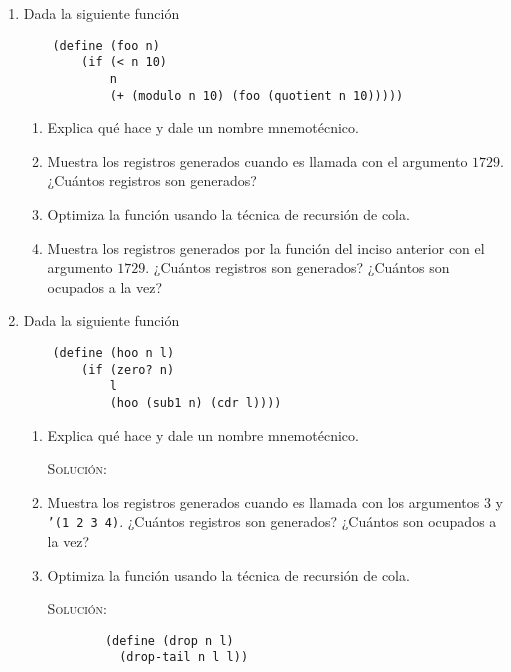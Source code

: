 \documentclass[letterpaper,11pt]{article}
\begin{document}
\begin{enumerate}
    \item Dada la siguiente función 
    \begin{verbatim}
    (define (foo n)
        (if (< n 10)
            n
            (+ (modulo n 10) (foo (quotient n 10)))))
    \end{verbatim}

    \begin{enumerate}
        \item Explica qué hace y dale un nombre mnemotécnico.

        \item Muestra los registros generados cuando es llamada con el 
        argumento $1729$. ¿Cuántos registros son generados?

        \item Optimiza la función usando la técnica de recursión de cola.

        \item Muestra los registros generados por la función del inciso anterior 
        con el argumento $1729$. ¿Cuántos registros son generados? ¿Cuántos son 
        ocupados a la vez?
    \end{enumerate}

    \item Dada la siguiente función 
    \begin{verbatim}
    (define (hoo n l)
        (if (zero? n)
            l
            (hoo (sub1 n) (cdr l))))
    \end{verbatim}

    \begin{enumerate}
        \item Explica qué hace y dale un nombre mnemotécnico.
        
        \textsc{Solución:}

        \item Muestra los registros generados cuando es llamada con los 
        argumentos $3$ y \texttt{'(1 2 3 4)}. ¿Cuántos registros son generados?
        ¿Cuántos son ocupados a la vez?

        \item Optimiza la función usando la técnica de recursión de cola.
        
        \textsc{Solución:}
        \begin{verbatim}
        (define (drop n l)
          (drop-tail n l l))
          

\end{verbatim}
\end{enumerate}
\end{enumerate}
\end{document}
